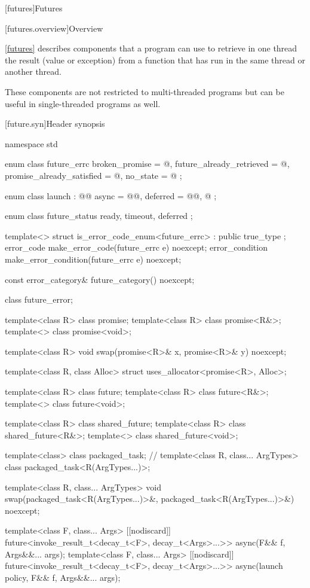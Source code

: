 [futures]{Futures}

[futures.overview]{Overview}

\pnum
\ref{futures} describes components that a \Cpp{} program can use to retrieve in one thread the
result (value or exception) from a function that has run in the same thread or another thread.
\begin{note}
These components are not restricted to multi-threaded programs but can be useful in
single-threaded programs as well.
\end{note}

[future.syn]{Header  synopsis}

%
%
\begin{codeblock}
namespace std {
  enum class future_errc {
    broken_promise = @\impdef@,
    future_already_retrieved = @\impdef@,
    promise_already_satisfied = @\impdef@,
    no_state = @\impdef@
  };

  enum class launch : @\unspec{}@ {
    async = @\unspec{}@,
    deferred = @\unspec{}@,
    @\impdef@
  };

  enum class future_status {
    ready,
    timeout,
    deferred
  };

  template<> struct is_error_code_enum<future_errc> : public true_type { };
  error_code make_error_code(future_errc e) noexcept;
  error_condition make_error_condition(future_errc e) noexcept;

  const error_category& future_category() noexcept;

  class future_error;

  template<class R> class promise;
  template<class R> class promise<R&>;
  template<> class promise<void>;

  template<class R>
    void swap(promise<R>& x, promise<R>& y) noexcept;

  template<class R, class Alloc>
    struct uses_allocator<promise<R>, Alloc>;

  template<class R> class future;
  template<class R> class future<R&>;
  template<> class future<void>;

  template<class R> class shared_future;
  template<class R> class shared_future<R&>;
  template<> class shared_future<void>;

  template<class> class packaged_task;  // \notdef
  template<class R, class... ArgTypes>
    class packaged_task<R(ArgTypes...)>;

  template<class R, class... ArgTypes>
    void swap(packaged_task<R(ArgTypes...)>&, packaged_task<R(ArgTypes...)>&) noexcept;

  template<class F, class... Args>
    [[nodiscard]] future<invoke_result_t<decay_t<F>, decay_t<Args>...>>
      async(F&& f, Args&&... args);
  template<class F, class... Args>
    [[nodiscard]] future<invoke_result_t<decay_t<F>, decay_t<Args>...>>
      async(launch policy, F&& f, Args&&... args);
}
\end{codeblock}

